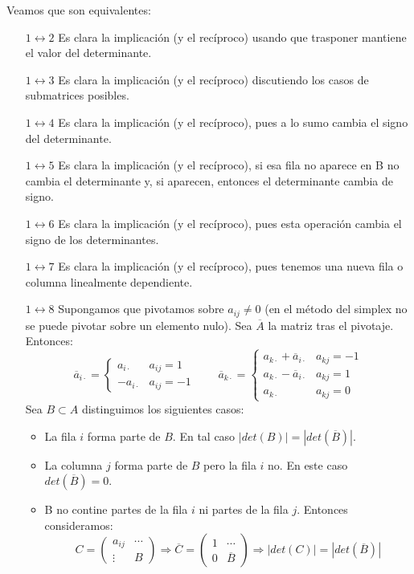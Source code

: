 \documentclass[PM.tex]{subfiles}
\begin{document}
\begin{dem}
Veamos que son equivalentes:
\begin{itemize}
\item [$1 \leftrightarrow 2$] Es clara la implicación (y el recíproco) usando que trasponer mantiene el valor del determinante.
\item [$1 \leftrightarrow 3$] Es clara la implicación (y el recíproco) discutiendo los casos de submatrices posibles.
\item [$1 \leftrightarrow 4$] Es clara la implicación (y el recíproco), pues a lo sumo cambia el signo del determinante.
\item [$1 \leftrightarrow 5$] Es clara la implicación (y el recíproco), si esa fila no aparece en B no cambia el determinante y, si aparecen, entonces el determinante cambia de signo.
\item [$1 \leftrightarrow 6$] Es clara la implicación (y el recíproco), pues esta operación cambia el signo de los determinantes.
\item [$1 \leftrightarrow 7$] Es clara la implicación (y el recíproco), pues tenemos una nueva fila o columna linealmente dependiente.
\item [$1 \leftrightarrow 8$] Supongamos que pivotamos sobre $a_{ij}\neq 0$ (en el método del simplex no se puede pivotar sobre un elemento nulo). Sea $\overline{A}$ la matriz tras el pivotaje. Entonces:
\[
\overline{a}_{i\cdot}=
\begin{cases}
a_{i\cdot} & a_{ij}=1\\
-a_{i\cdot} & a_{ij}=-1
\end{cases}
\qquad
\overline{a}_{k\cdot}=
\begin{cases}
{a}_{k\cdot}+\overline{a}_{i\cdot} & a_{kj}=-1\\
{a}_{k\cdot}-\overline{a}_{i\cdot} & a_{kj}=1\\
{a}_{k\cdot} & a_{kj}=0
\end{cases}
\]
Sea $B\subset A$ distinguimos los siguientes casos:
\begin{itemize}
\item La fila $i$ forma parte de $B$. En tal caso $|det(B)|=|det(\overline{B})|$.
\item La columna $j$ forma parte de $B$ pero la fila $i$ no. En este caso $det(\overline{B})=0$.
\item B no contine partes de la fila $i$ ni partes de la fila $j$. Entonces consideramos:
\[
C=
\begin{pmatrix}
a_{ij} & \cdots\\
\vdots & B
\end{pmatrix} \Rightarrow \overline{C} = 
\begin{pmatrix}
1 & \cdots\\
0 & \overline{B}
\end{pmatrix} \Rightarrow |det(C)| = |det(\overline{B})|
\]
\end{itemize}
\end{itemize}
\end{dem}
\end{document}
